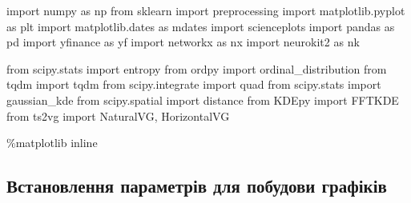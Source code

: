 \documentclass[
  letterpaper,
]{report}
\newenvironment{Shaded}{\begin{snugshade}}{\end{snugshade}}
\newcommand{\ImportTok}[1]{\textcolor[rgb]{0.00,0.46,0.62}{#1}}
\newcommand{\NormalTok}[1]{\textcolor[rgb]{0.00,0.23,0.31}{#1}}
\newcommand{\OperatorTok}[1]{\textcolor[rgb]{0.37,0.37,0.37}{#1}}
\begin{document}
\begin{Shaded}
\begin{Highlighting}[]
\ImportTok{import}\NormalTok{ numpy }\ImportTok{as}\NormalTok{ np}
\ImportTok{from}\NormalTok{ sklearn }\ImportTok{import}\NormalTok{ preprocessing}
\ImportTok{import}\NormalTok{ matplotlib.pyplot }\ImportTok{as}\NormalTok{ plt}
\ImportTok{import}\NormalTok{ matplotlib.dates }\ImportTok{as}\NormalTok{ mdates}
\ImportTok{import}\NormalTok{ scienceplots}
\ImportTok{import}\NormalTok{ pandas }\ImportTok{as}\NormalTok{ pd}
\ImportTok{import}\NormalTok{ yfinance }\ImportTok{as}\NormalTok{ yf}
\ImportTok{import}\NormalTok{ networkx }\ImportTok{as}\NormalTok{ nx}
\ImportTok{import}\NormalTok{ neurokit2 }\ImportTok{as}\NormalTok{ nk}

\ImportTok{from}\NormalTok{ scipy.stats }\ImportTok{import}\NormalTok{ entropy}
\ImportTok{from}\NormalTok{ ordpy }\ImportTok{import}\NormalTok{ ordinal\_distribution}
\ImportTok{from}\NormalTok{ tqdm }\ImportTok{import}\NormalTok{ tqdm}
\ImportTok{from}\NormalTok{ scipy.integrate }\ImportTok{import}\NormalTok{ quad}
\ImportTok{from}\NormalTok{ scipy.stats }\ImportTok{import}\NormalTok{ gaussian\_kde}
\ImportTok{from}\NormalTok{ scipy.spatial }\ImportTok{import}\NormalTok{ distance}
\ImportTok{from}\NormalTok{ KDEpy }\ImportTok{import}\NormalTok{ FFTKDE}
\ImportTok{from}\NormalTok{ ts2vg }\ImportTok{import}\NormalTok{ NaturalVG, HorizontalVG}

\OperatorTok{\%}\NormalTok{matplotlib inline}
\end{Highlighting}
\end{Shaded}

\hypertarget{ux432ux441ux442ux430ux43dux43eux432ux43bux435ux43dux43dux44f-ux43fux430ux440ux430ux43cux435ux442ux440ux456ux432-ux434ux43bux44f-ux43fux43eux431ux443ux434ux43eux432ux438-ux433ux440ux430ux444ux456ux43aux456ux432}{%
\subsection{Встановлення параметрів для побудови
графіків}\label{ux432ux441ux442ux430ux43dux43eux432ux43bux435ux43dux43dux44f-ux43fux430ux440ux430ux43cux435ux442ux440ux456ux432-ux434ux43bux44f-ux43fux43eux431ux443ux434ux43eux432ux438-ux433ux440ux430ux444ux456ux43aux456ux432}}
\end{document}
